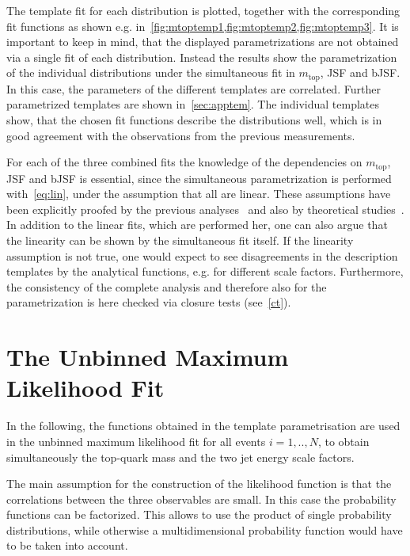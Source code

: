  The template fit for each distribution is plotted, together with the corresponding fit functions as shown e.g. in~\cref{fig:mtoptemp1,fig:mtoptemp2,fig:mtoptemp3}. It is important to keep in mind, that the displayed parametrizations are not obtained via a single fit of each distribution. Instead the results show the parametrization of the individual distributions under the simultaneous fit in $m_{\text{top}}$, JSF and bJSF. In this case, the parameters of the different templates are correlated. Further parametrized templates are shown in~\cref{sec:apptem}. The individual templates show, that the chosen fit functions describe the distributions well, which is in good agreement with the observations from the previous measurements.

For each of the three combined fits the knowledge of the dependencies on $m_{\text{top}}$, JSF and bJSF is essential, since the simultaneous parametrization is performed with~\cref{eq:lin}, under the assumption that all  are linear. 
These assumptions have been explicitly proofed by the previous analyses~\cite{Aad:2015nba,ATLAS-CONF-2017-071}  and also by theoretical studies~\cite{Heinrich:2017bqp}. In addition to the linear fits, which are performed her, one can also argue that the linearity can be shown by the simultaneous fit itself.  If the linearity assumption is not true, one would expect to see disagreements in the description  templates by the analytical functions, e.g. for different scale factors. Furthermore, the consistency of the complete analysis and therefore also for the parametrization is here checked via closure tests (see~\cref{ct}).




 
 




\section{The Unbinned Maximum Likelihood Fit}
In the following, the functions obtained in the template parametrisation are used in the unbinned maximum likelihood fit
for all events $i = 1,..,N$, to obtain simultaneously the top-quark mass and the two jet energy scale factors. 

 The main assumption for the construction of the likelihood function is that the correlations between the three observables are small. In this case the probability  functions can be factorized. This allows to use the product of single probability distributions, while otherwise a multidimensional probability function would have to be taken into account.



